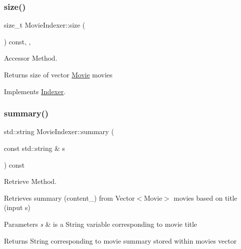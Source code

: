 \subsubsection{\texorpdfstring{size()}{size()}}
{\footnotesize\ttfamily size\+\_\+t Movie\+Indexer\+::size (\begin{DoxyParamCaption}{ }\end{DoxyParamCaption}) const\hspace{0.3cm}{\ttfamily [inline]}, {\ttfamily [override]}, {\ttfamily [virtual]}}



Accessor Method. 

Returns size of vector \hyperlink{class_movie}{Movie} movies 

Implements \hyperlink{class_indexer_ab8b3e17bbf16d54e1e773a1630abb138}{Indexer}.

\mbox{\label{class_movie_indexer_a6723af1e2988be60cd24cad2014a7cad}} 
\subsubsection{\texorpdfstring{summary()}{summary()}}
{\footnotesize\ttfamily std\+::string Movie\+Indexer\+::summary (\begin{DoxyParamCaption}\item[{const std\+::string \&}]{s }\end{DoxyParamCaption}) const}



Retrieve Method. 

Retrieves summary (content\+\_\+) from Vector$<$\+Movie$>$ movies based on title (input s)


\begin{DoxyParams}{Parameters}
{\em s} & is a String variable corresponding to movie title \\
\hline
\end{DoxyParams}
\begin{DoxyReturn}{Returns}
String corresponding to movie summary stored within movies vector 
\end{DoxyReturn}
\mbox{\label{class_movie_indexer_a4bba45f6f42bbbfb88a5f7d6aa56d0b3}} 

